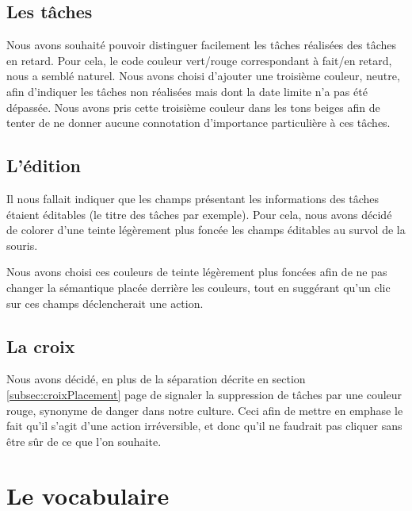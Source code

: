 \documentclass[11pt]{article}
\begin{document}
\subsection{Les tâches}

Nous avons souhaité pouvoir distinguer facilement les tâches réalisées
des tâches en retard. Pour cela, le code couleur vert/rouge
correspondant à fait/en retard, nous a semblé naturel. Nous avons
choisi d'ajouter une troisième couleur, neutre, afin d'indiquer les
tâches non réalisées mais dont la date limite n'a pas été dépassée.
Nous avons pris cette troisième couleur dans les tons beiges afin de
tenter de ne donner aucune connotation d'importance particulière à ces
tâches.



\subsection{L'édition}

Il nous fallait indiquer que les champs présentant les informations
des tâches étaient éditables (le titre des tâches par exemple). Pour
cela, nous avons décidé de colorer d'une teinte légèrement plus foncée
les champs éditables au survol de la souris.

Nous avons choisi ces couleurs de teinte légèrement plus foncées afin
de ne pas changer la sémantique placée derrière les couleurs, tout en
suggérant qu'un clic sur ces champs déclencherait une action.



\subsection{La croix}

Nous avons décidé, en plus de la séparation décrite en section
\ref{subsec:croixPlacement} page \pageref{subsec:croixPlacement} de
signaler la suppression de tâches par une couleur rouge, synonyme de
danger dans notre culture. Ceci afin de mettre en emphase le fait
qu'il s'agit d'une action irréversible, et donc qu'il ne faudrait pas
cliquer sans être sûr de ce que l'on souhaite.


\section{Le vocabulaire}
\end{document}
